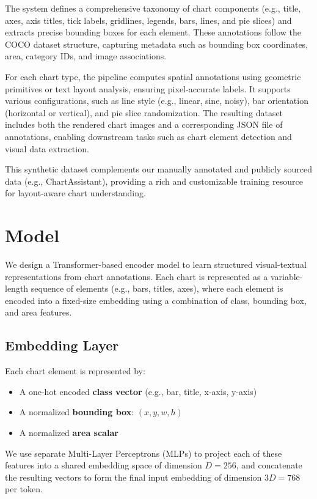 \documentclass[11pt]{article}
\begin{document}
The system defines a comprehensive taxonomy of chart components (e.g., title, axes, axis titles, tick labels, gridlines, legends, bars, lines, and pie slices) and extracts precise bounding boxes for each element. These annotations follow the COCO dataset structure, capturing metadata such as bounding box coordinates, area, category IDs, and image associations.

For each chart type, the pipeline computes spatial annotations using geometric primitives or text layout analysis, ensuring pixel-accurate labels. It supports various configurations, such as line style (e.g., linear, sine, noisy), bar orientation (horizontal or vertical), and pie slice randomization. The resulting dataset includes both the rendered chart images and a corresponding JSON file of annotations, enabling downstream tasks such as chart element detection and visual data extraction.

This synthetic dataset complements our manually annotated and publicly sourced data (e.g., ChartAssistant), providing a rich and customizable training resource for layout-aware chart understanding.

\section{Model}

We design a Transformer-based encoder model to learn structured visual-textual representations from chart annotations. Each chart is represented as a variable-length sequence of elements (e.g., bars, titles, axes), where each element is encoded into a fixed-size embedding using a combination of class, bounding box, and area features.

\subsection*{Embedding Layer}

Each chart element is represented by:
\begin{itemize}
    \item A one-hot encoded \textbf{class vector} (e.g., bar, title, x-axis, y-axis)
    \item A normalized \textbf{bounding box}: $(x, y, w, h)$
    \item A normalized \textbf{area scalar}
\end{itemize}

We use separate Multi-Layer Perceptrons (MLPs) to project each of these features into a shared embedding space of dimension $D=256$, and concatenate the resulting vectors to form the final input embedding of dimension $3D=768$ per token.
\end{document}
